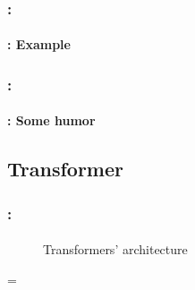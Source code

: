 \documentclass[xcolor=table]{beamer}
\begin{document}
\begin{frame}
	\frametitle{\insertshortsubtitle: \insertsection}
	\framesubtitle{\insertsubsection: Example}
	
	\begin{center}
	\end{center}
	
\end{frame}

\begin{frame}
	\frametitle{\insertshortsubtitle: \insertsection}
	\framesubtitle{\insertsubsection: Some humor}
	
	
\end{frame}


\subsection{Transformer}

\begin{frame}
	\frametitle{\insertshortsubtitle: \insertsection}
	\framesubtitle{\insertsubsection}

	\begin{minipage}{0.49\textwidth}
		\begin{figure}
			\centering
			\caption{Transformers' architecture \cite{2017-vaswani-al}}
		\end{figure}
	\end{minipage}
	\begin{minipage}{0.1\textwidth}
		=
	\end{minipage}
	\begin{minipage}{0.39\textwidth}
	\end{minipage}

	
\end{frame}
\end{document}
